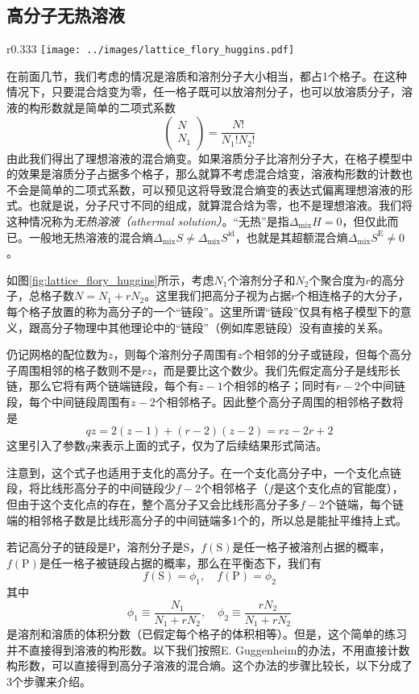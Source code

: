 \documentclass[main.tex]{subfiles}
\begin{document}
\subsection{高分子无热溶液}
\begin{wrapfigure}{r}{0.333\textwidth}
  \centering
  \texttt{[image: ../images/lattice\_flory\_huggins.pdf]}
  \caption{一条高分子链的链段在网格中的一种放置方式。}
  \label{fig:lattice_flory_huggins}
\end{wrapfigure}

在前面几节，我们考虑的情况是溶质和溶剂分子大小相当，都占1个格子。在这种情况下，只要混合焓变为零，任一格子既可以放溶剂分子，也可以放溶质分子，溶液的构形数就是简单的二项式系数
\[\left(\begin{array}{cc}N\\N_1\end{array}\right)=\frac{N!}{N_1!N_2!}\]
由此我们得出了理想溶液的混合熵变。如果溶质分子比溶剂分子大，在格子模型中的效果是溶质分子占据多个格子，那么就算不考虑混合焓变，溶液构形数的计数也不会是简单的二项式系数，可以预见这将导致混合熵变的表达式偏离理想溶液的形式。也就是说，分子尺寸不同的组成，就算混合焓为零，也不是理想溶液。我们将这种情况称为\emph{无热溶液（athermal solution）}。“无热”是指$\Delta_\text{mix}H=0$，但仅此而已。一般地无热溶液的混合熵$\Delta_\text{mix}S\neq\Delta_\text{mix}S^\text{id}$，也就是其超额混合熵$\Delta_\text{mix}S^\text{E}\neq 0$。

如图\ref{fig:lattice_flory_huggins}所示，考虑$N_1$个溶剂分子和$N_2$个聚合度为$r$的高分子，总格子数$N=N_1+rN_2$。这里我们把高分子视为占据$r$个相连格子的大分子，每个格子放置的称为高分子的一个“链段”。这里所谓“链段”仅具有格子模型下的意义，跟高分子物理中其他理论中的“链段”（例如库恩链段）没有直接的关系。

仍记网格的配位数为$z$，则每个溶剂分子周围有$z$个相邻的分子或链段，但每个高分子周围相邻的格子数则不是$rz$，而是要比这个数少。我们先假定高分子是线形长链，那么它将有两个链端链段，每个有$z-1$个相邻的格子；同时有$r-2$个中间链段，每个中间链段周围有$z-2$个相邻格子。因此整个高分子周围的相邻格子数将是
\[qz=2\left(z-1\right)+\left(r-2\right)\left(z-2\right)=rz-2r+2\]
这里引入了参数$q$来表示上面的式子，仅为了后续结果形式简洁。

注意到，这个式子也适用于支化的高分子。在一个支化高分子中，一个支化点链段，将比线形高分子的中间链段少$f-2$个相邻格子（$f$是这个支化点的官能度），但由于这个支化点的存在，整个高分子又会比线形高分子多$f-2$个链端，每个链端的相邻格子数是比线形高分子的中间链端多1个的，所以总是能扯平维持上式。

若记高分子的链段是P，溶剂分子是S，$f\left(\text{S}\right)$是任一格子被溶剂占据的概率，$f\left(\text{P}\right)$是任一格子被链段占据的概率，那么在平衡态下，我们有
\[f\left(\text{S}\right)=\phi_1,\quad f\left(\text{P}\right)=\phi_2\]
其中
\[\phi_1\equiv\frac{N_1}{N_1+rN_2},\quad\phi_2\equiv\frac{rN_2}{N_1+rN_2}\]
是溶剂和溶质的体积分数（已假定每个格子的体积相等）。但是，这个简单的练习并不直接得到溶液的构形数。以下我们按照E. Guggenheim的办法\cite{Guggenheim1952,Tompa1956}，不用直接计数构形数，可以直接得到高分子溶液的混合熵。这个办法的步骤比较长，以下分成了3个步骤来介绍。
\end{document}
